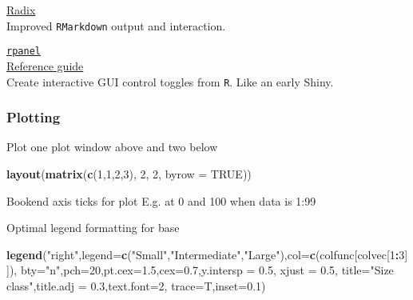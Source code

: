 \documentclass[10,portrait]{article}
\newenvironment{Shaded}{\begin{snugshade}}{\end{snugshade}}
\newcommand{\KeywordTok}[1]{\textcolor[rgb]{0.13,0.29,0.53}{\textbf{#1}}}
\newcommand{\DataTypeTok}[1]{\textcolor[rgb]{0.13,0.29,0.53}{#1}}
\newcommand{\DecValTok}[1]{\textcolor[rgb]{0.00,0.00,0.81}{#1}}
\newcommand{\FloatTok}[1]{\textcolor[rgb]{0.00,0.00,0.81}{#1}}
\newcommand{\StringTok}[1]{\textcolor[rgb]{0.31,0.60,0.02}{#1}}
\newcommand{\CommentTok}[1]{\textcolor[rgb]{0.56,0.35,0.01}{\textit{#1}}}
\newcommand{\OtherTok}[1]{\textcolor[rgb]{0.56,0.35,0.01}{#1}}
\newcommand{\OperatorTok}[1]{\textcolor[rgb]{0.81,0.36,0.00}{\textbf{#1}}}
\newcommand{\NormalTok}[1]{#1}
\begin{document}
\href{https://blog.rstudio.com/2018/09/19/radix-for-r-markdown/}{Radix}\\
Improved \texttt{RMarkdown} output and interaction.

\href{http://www.stats.gla.ac.uk/~adrian/rpanel/}{\texttt{rpanel}}\\
\href{https://cran.r-project.org/doc/Rnews/Rnews_2006-4.pdf}{Reference
guide}\\
Create interactive GUI control toggles from \texttt{R}. Like an early
Shiny.

\subsubsection{Plotting}\label{plotting}

Plot one plot window above and two below

\begin{Shaded}
\begin{Highlighting}[]
\KeywordTok{layout}\NormalTok{(}\KeywordTok{matrix}\NormalTok{(}\KeywordTok{c}\NormalTok{(}\DecValTok{1}\NormalTok{,}\DecValTok{1}\NormalTok{,}\DecValTok{2}\NormalTok{,}\DecValTok{3}\NormalTok{), }\DecValTok{2}\NormalTok{, }\DecValTok{2}\NormalTok{, }\DataTypeTok{byrow =} \OtherTok{TRUE}\NormalTok{))}
\end{Highlighting}
\end{Shaded}

Bookend axis ticks for plot E.g. at 0 and 100 when data is 1:99

\begin{Shaded}
\end{Shaded}

Optimal legend formatting for base

\begin{Shaded}
\begin{Highlighting}[]
\KeywordTok{legend}\NormalTok{(}\StringTok{"right"}\NormalTok{,}\DataTypeTok{legend=}\KeywordTok{c}\NormalTok{(}\StringTok{"Small"}\NormalTok{,}\StringTok{"Intermediate"}\NormalTok{,}\StringTok{"Large"}\NormalTok{),}\DataTypeTok{col=}\KeywordTok{c}\NormalTok{(colfunc[colvec[}\DecValTok{1}\OperatorTok{:}\DecValTok{3}\NormalTok{]]),}
       \DataTypeTok{bty=}\StringTok{"n"}\NormalTok{,}\DataTypeTok{pch=}\DecValTok{20}\NormalTok{,}\DataTypeTok{pt.cex=}\FloatTok{1.5}\NormalTok{,}\DataTypeTok{cex=}\FloatTok{0.7}\NormalTok{,}\DataTypeTok{y.intersp =} \FloatTok{0.5}\NormalTok{, }\DataTypeTok{xjust =} \FloatTok{0.5}\NormalTok{,}
       \DataTypeTok{title=}\StringTok{"Size class"}\NormalTok{,}\DataTypeTok{title.adj =} \FloatTok{0.3}\NormalTok{,}\DataTypeTok{text.font=}\DecValTok{2}\NormalTok{,}
       \DataTypeTok{trace=}\NormalTok{T,}\DataTypeTok{inset=}\FloatTok{0.1}\NormalTok{)}
\end{Highlighting}
\end{Shaded}
\end{document}
